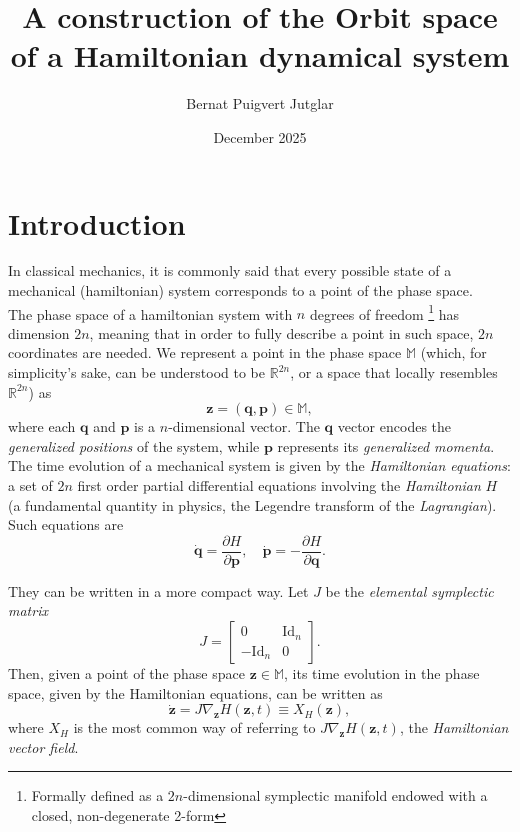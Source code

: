 \documentclass[12pt]{article}
\title{\textbf{A construction of the Orbit space of a Hamiltonian dynamical system}}
\author{Bernat Puigvert Jutglar}
\date{December 2025}
\theoremstyle{plain}
\newcommand{\R}{\mathbb{R}}
\newcommand{\M}{\mathbb{M}}
\begin{document}
\maketitle

\tableofcontents

\section{Introduction}

In classical mechanics, it is commonly said that every possible state of a mechanical (hamiltonian) system corresponds to a point of the phase space.\\

The phase space of a hamiltonian system with $n$ degrees of freedom \footnote{Formally defined as a $2n$-dimensional symplectic manifold endowed with a closed, non-degenerate 2-form} has dimension $2n$, meaning that in order to fully describe a point in such space, $2n$ coordinates are needed. We represent a point in the phase space $\M$ (which, for simplicity's sake, can be understood to be $\R^{2n}$, or a space that locally resembles $\R^{2n}$) as 
$$\mathbf{z} = (\mathbf{q},\mathbf{p})\in\M,$$
where each $\mathbf{q}$ and $\mathbf{p}$ is a $n$-dimensional vector. The $\mathbf{q}$ vector encodes the \textit{generalized positions} of the system, while $\mathbf{p}$ represents its \textit{generalized momenta}.\\

The time evolution of a mechanical system is given by the \textit{Hamiltonian equations}: a set of $2n$ first order partial differential equations involving the \textit{Hamiltonian} $H$ (a fundamental quantity in physics, the Legendre transform of the \textit{Lagrangian}). Such equations are 
$$\dot{\mathbf{q}} = \frac{\partial H}{\partial \mathbf{p}},\quad \dot{\mathbf{p}} = -\frac{\partial H}{\partial \mathbf{q}}.$$

They can be written in a more compact way. Let $J$ be the \textit{elemental symplectic matrix} $$J = \begin{bmatrix}
    0 & \text{Id}_{n}\\
    -\text{Id}_{n} & 0
\end{bmatrix}.$$
Then, given a point of the phase space $\mathbf{z}\in\M$, its time evolution in the phase space, given by the Hamiltonian equations, can be written as 
$$\dot{\mathbf{z}} = J\nabla_{\mathbf{z}}H(\mathbf{z},t) \equiv X_{H}(\mathbf{z}),$$ where $X_H$ is the most common way of referring to $J\nabla_{\mathbf{z}}H(\mathbf{z},t)$, the \textit{Hamiltonian vector field}.\\
\end{document}
